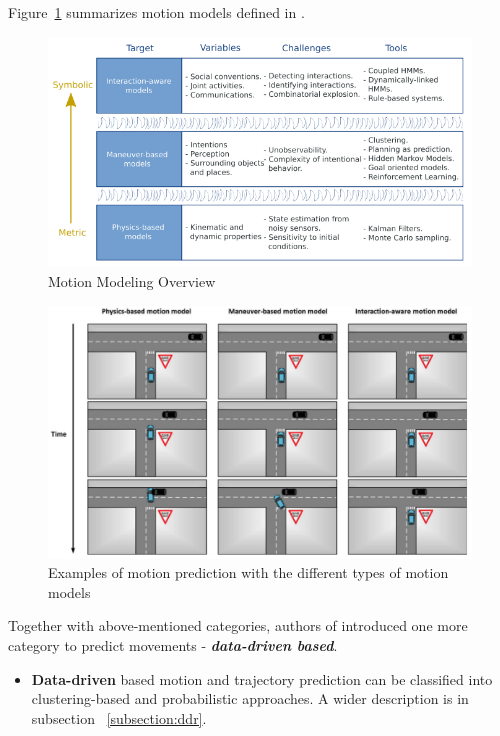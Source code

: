 Figure~\ref{fig:MotModOv} summarizes motion models defined in \cite{ClassificationI}.

\begin{figure}[h]
	\centering  	
	\includegraphics[width=13cm]{img/2.jpg}
	\caption{Motion Modeling Overview \cite{ClassificationI}}
	\label{fig:MotModOv}    
\end{figure}


\begin{figure}[h]
	\centering  	
	\includegraphics[width=13cm]{img/5.jpg}
	\caption{Examples of motion prediction with the different types of motion models \cite{ClassificationI}}
	\label{fig:MotModOv2}    
\end{figure}

Together with above-mentioned categories, authors of \cite{ClassificationII} introduced one more category to predict movements - \textbf{\textit{data-driven based}}.

\begin{itemize}
	\item \textbf{Data-driven} based motion and trajectory prediction can be classified into clustering-based and probabilistic approaches. A wider description is in subsection ~\ref{subsection:ddr}.
\end{itemize}

